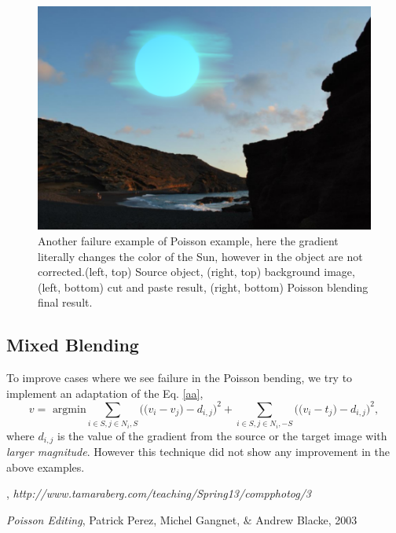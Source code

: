 \documentclass[11pt]{article}
\begin{document}
\begin{figure} [ht]
\begin{center}
\includegraphics[scale=0.47]{results_poisson/set5/im5.png}   
\caption{Another failure  example of Poisson example, here the gradient literally changes the color of the Sun, however in the object are not corrected.(left, top) Source object, (right, top) background image,   (left, bottom) cut and paste result, (right, bottom) Poisson blending final result.}
\label{4}
\end{center}
\end{figure}

\quad




\subsection*{Mixed Blending}
To improve cases where we see failure in the Poisson bending,  we try to implement an adaptation of the Eq. \ref{aa},
\begin{equation}
v = \mbox{ argmin} \sum_{i \in S, j \in N_i, S} \Bigg ( \Big ( v_i -v_j\Big) - d_{i,j} \Bigg)^2 +  \sum_{i \in S, j \in N_i, -S} \Bigg ( \Big ( v_i -t_j\Big) - d_{i,j} \Bigg)^2,
\end{equation}
where $d_{i,j}$ is the value of the gradient from the source or the target image with {\it larger magnitude}. However this technique  did not show any improvement in the above examples.


\newpage





\begin{thebibliography}{}

, {\it http://www.tamaraberg.com/teaching/Spring13/compphotog/3}

 {\it Poisson Editing}, Patrick Perez, Michel Gangnet, $\&$ Andrew Blacke, 2003

\end{thebibliography}
\end{document}
